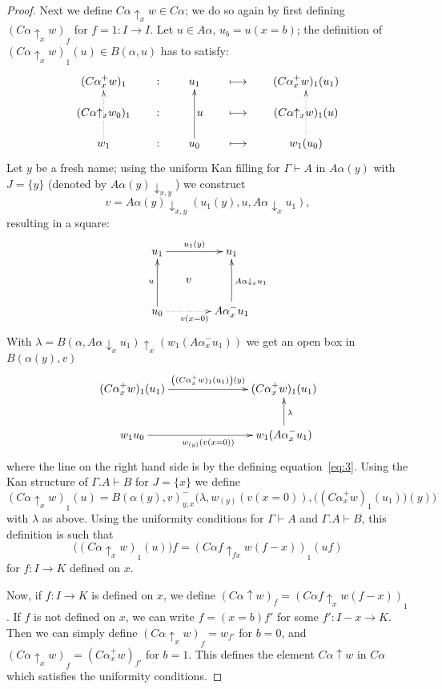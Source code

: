 \documentclass[10pt,a4paper]{article}
\newcommand{\set}[1]{\{#1\}}
\newcommand{\lto}{\longmapsto}
\newcommand{\rup}[1]{#1{\uparrow}}
\newcommand{\rdo}[1]{#1{\downarrow}}
\newcommand{\rupx}[1]{#1{\uparrow_{x}}}
\newcommand{\rdox}[1]{#1{\downarrow_{x}}}
\newcommand{\rdoxy}[1]{#1{\downarrow_{x,y}}}
\newcommand{\del}[1]{}
\begin{document}
\begin{proof}
  Next we define $\rup{C \alpha}_x w \in C \alpha$; we do so again by
  first defining $(\rup{C \alpha}_x w)_f$ for $f = 1 \colon I \to I$.
  Let $u \in A \alpha$, $u_b = u (x = b)$; the definition of
  $(\rupx{C\alpha} w)_1 (u) \in B(\alpha,u)$ has to satisfy:
  \[
  \xymatrix@R=.4cm@C=.6cm {({C \alpha}^+_x w)_1 &:& u_1 \del{\in
      A\alpha(x=1)} &\lto & ({C \alpha}^+_x w)_1 (u_1)
    \del{\in B(\alpha(x=1),u_1)}\\
    (\rupx{C\alpha}w_0)_1 &:& ~~~u\del{\in A\alpha} &\lto &
    (\rupx{C\alpha} w)_1 (u)\del{\in B(\alpha,u)}\\
    w_1\ar@{.>}[uu] &:& u_0\del{\in A\alpha(x=0)}\ar[uu] &\lto &
    w_1 (u_0)\del{\in B(\alpha(x=0),u_0)}\ar@{.>}[uu]\\
  }
  \]
  Let $y$ be a fresh name; using the uniform Kan filling for $\Gamma
  \vdash A$ in $ A \alpha (y)$ with $J = \set {y}$ (denoted by
  $\rdoxy{A\alpha(y)}$) we construct
  \[
  v = \rdoxy{A\alpha(y)} {(u_1 (y),u,\rdox{A\alpha} u_1)},
  \]
  resulting in a square:
  \[
  \xymatrix@R=.5cm@C=.5cm{
    u_1 \ar[rr]^{u_1 (y)} & & u_1 \\
    & v & \\
    u_0 \ar[uu]^u \ar@{.>}[rr]_{v (x=0)} & & {A \alpha}^-_x u_1
    \ar[uu]_{ \rdox{A \alpha} u_1} }
  \]
  With $\lambda = \rupx {B(\alpha,\rdo{A\alpha}_x u_1)} (w_1
  (A\alpha^-_x u_1))$ we get an open box in $B (\alpha (y), v)$
  \[
  \xymatrix@C=2.5cm{ ({C \alpha}^+_x w)_1 (u_1) \ar[r]^{\left(({C
          \alpha}^+_x w)_1 (u_1)\right) (y)}& ({C \alpha}^+_x w)_1
    (u_1) \\
    w_1 u_0 \ar[r]_{w_{(y)} (v (x=0))} & w_1 ({A \alpha}^-_x u_1)
    \ar[u]_\lambda}
  \]
  where the line on the right hand side is by the defining
  equation~\eqref{eq:3}.  Using the Kan structure of $\Gamma.A\vdash
  B$ for $J=\set{x}$ we define
  \[
  (\rupx{C\alpha}w)_1 (u) = {B(\alpha(y),v)}^-_{y,x}\bigl(\lambda,
  w_{(y)} (v (x=0)), {\bigl(({C \alpha}^+_x w)_1 (u_1)\bigr)
    (y)}\bigr)
  \]
  with $\lambda$ as above.  Using the uniformity conditions for
  $\Gamma \vdash A$ and $\Gamma.A \vdash B$, this definition is such
  that
  \[
  \bigl((\rupx{C\alpha}w)_1 (u)\bigr) f = (\rup{C\alpha f}_{fx} {w
    (f-x)})_1 (u f)
  \]
  for $f \colon I \to K$ defined on $x$.

  Now, if $f:I\to K$ is defined on $x$, we define $(\rup{C\alpha} w)_f
  = (\rupx{C \alpha f} w (f-x))_1$.  If $f$ is not defined on $x$, we
  can write $f=(x=b)f'$ for some $f':I-x \to K$.  Then we can simply
  define $(\rupx{ C\alpha} w)_f = w_{f'}$ for $b=0$, and $(\rupx{
    C\alpha} w)_f = ({C \alpha}^+_x w)_{f'}$ for $b=1$.  This defines
  the element $\rup{C\alpha} w$ in $C \alpha$ which satisfies the
  uniformity conditions.


\end{proof}
\end{document}
